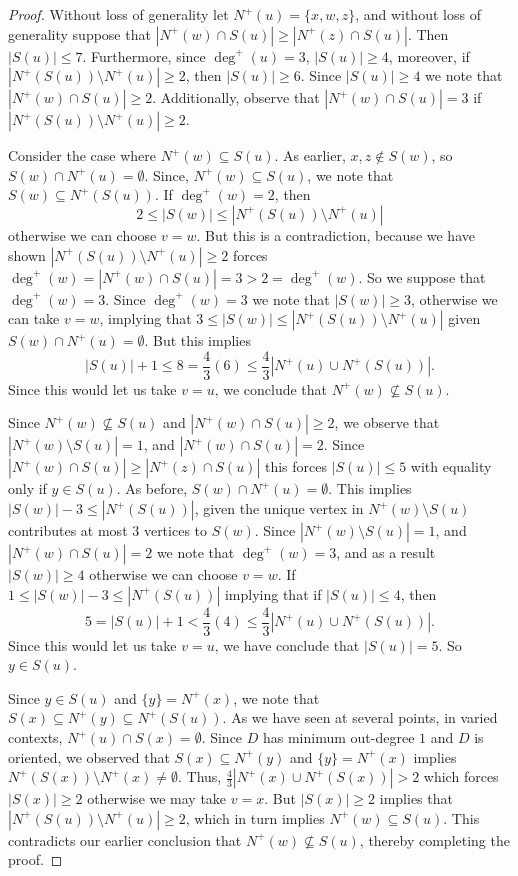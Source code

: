 \documentclass[12pt]{article}
\theoremstyle{definition}
\begin{document}
\begin{proof}
    Without loss of generality let $N^+(u) = \{x,w,z\}$,
    and without loss of generality suppose that $|N^+(w)\cap S(u)|\geq |N^+(z)\cap S(u)|$.
    Then $|S(u)|\leq 7$.
    Furthermore,
    since $\deg^+(u) = 3$, $|S(u)|\geq 4$,
    moreover, if $|N^+(S(u))\setminus N^+(u)|\geq 2$, then $|S(u)|\geq 6$.
    Since $|S(u)|\geq 4$ we note that $|N^+(w)\cap S(u)| \geq 2$.
    Additionally, observe that $|N^+(w)\cap S(u)| = 3$ if $|N^+(S(u))\setminus N^+(u)|\geq 2$.

    Consider the case where $N^+(w)\subseteq S(u)$.
    As earlier, $x,z \notin S(w)$, so $S(w) \cap N^+(u) = \emptyset$.
    Since, $N^+(w)\subseteq S(u)$, we note that $S(w)\subseteq N^+(S(u))$.
    If $\deg^+(w) = 2$, then 
    \[
    2 \leq |S(w)| \leq |N^+(S(u))\setminus N^+(u)|
    \]
    otherwise we can choose $v = w$.
    But this is a contradiction, because we have shown $|N^+(S(u))\setminus N^+(u)|\geq 2$ forces 
    $\deg^+(w) = |N^+(w)\cap S(u)| = 3> 2 = \deg^+(w)$.
    So we suppose that $\deg^+(w) = 3$.
    Since $\deg^+(w) = 3$ we note that $|S(w)|\geq 3$,
    otherwise we can take $v = w$,
    implying that
    $3 \leq |S(w)| \leq |N^+(S(u))\setminus N^+(u)|$ given $S(w) \cap N^+(u) = \emptyset$.
    But this implies 
    \[
    |S(u)| + 1 \leq 8 = \frac{4}{3}(6) \leq \frac{4}{3}|N^+(u) \cup N^+(S(u))|.
    \]
    Since this would let us take $v = u$, we conclude that $N^+(w)\not\subseteq S(u)$.

    Since $N^+(w)\not\subseteq S(u)$ and $|N^+(w) \cap S(u)|\geq 2$,
    we observe that $|N^+(w)\setminus S(u)| = 1$, and $|N^+(w) \cap S(u)|= 2$.
    Since $|N^+(w)\cap S(u)|\geq |N^+(z)\cap S(u)|$ this forces $|S(u)|\leq 5$
    with equality only if $y \in S(u)$.
    As before, $S(w) \cap N^+(u) = \emptyset$.
    This implies $|S(w)| - 3 \leq |N^+(S(u))|$, given the unique vertex in $N^+(w)\setminus S(u)$
    contributes at most $3$ vertices to $S(w)$.
    Since $|N^+(w)\setminus S(u)| = 1$, and $|N^+(w) \cap S(u)|= 2$ we note that 
    $\deg^+(w) = 3$, and as a result $|S(w)|\geq 4$ otherwise we can choose $v = w$.
    If $1\leq |S(w)| - 3 \leq |N^+(S(u))|$ implying that if $|S(u)|\leq 4$, then 
    \[
    5 = |S(u)| + 1 < \frac{4}{3}(4) \leq \frac{4}{3}|N^+(u) \cup N^+(S(u))|.
    \]
    Since this would let us take $v = u$, we have conclude that $|S(u)|  = 5$.
    So $y \in S(u)$.

    Since $y \in S(u)$ and $\{y\} = N^+(x)$, we note that $S(x) \subseteq N^+(y) \subseteq N^+(S(u))$.
    As we have seen at several points, in varied contexts, $N^+(u)\cap S(x) = \emptyset$.
    Since $D$ has minimum out-degree $1$ and $D$ is oriented, we observed that
    $S(x) \subseteq N^+(y)$ and $\{y\} = N^+(x)$ implies $N^+(S(x))\setminus N^+(x) \neq \emptyset$.
    Thus, $\frac{4}{3}|N^+(x)\cup N^+(S(x))|> 2$ which forces $|S(x)|\geq 2$ otherwise we may take $v =x$.
    But $|S(x)|\geq 2$ implies that $|N^+(S(u))\setminus N^+(u)|\geq 2$,
    which in turn implies $N^+(w)\subseteq S(u)$.
    This contradicts our earlier conclusion that $N^+(w)\not\subseteq S(u)$,
    thereby completing the proof.
\end{proof}
\end{document}
